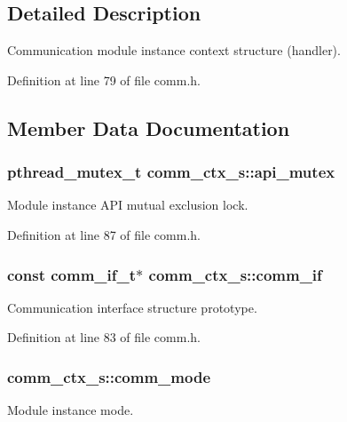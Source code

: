 \subsection{Detailed Description}
Communication module instance context structure (\textquotesingle{}handler\textquotesingle{}). 

Definition at line 79 of file comm.\+h.



\subsection{Member Data Documentation}
\subsubsection[{\texorpdfstring{api\+\_\+mutex}{api_mutex}}]{\setlength{\rightskip}{0pt plus 5cm}pthread\+\_\+mutex\+\_\+t comm\+\_\+ctx\+\_\+s\+::api\+\_\+mutex}\hypertarget{structcomm__ctx__s_a87f4bc5b93d50488325c43f384cb9d61}{}\label{structcomm__ctx__s_a87f4bc5b93d50488325c43f384cb9d61}
Module instance A\+PI mutual exclusion lock. 

Definition at line 87 of file comm.\+h.

\subsubsection[{\texorpdfstring{comm\+\_\+if}{comm_if}}]{\setlength{\rightskip}{0pt plus 5cm}const {\bf comm\+\_\+if\+\_\+t}$\ast$ comm\+\_\+ctx\+\_\+s\+::comm\+\_\+if}\hypertarget{structcomm__ctx__s_ada6c987982f09f27479ce375b5050534}{}\label{structcomm__ctx__s_ada6c987982f09f27479ce375b5050534}
Communication interface structure prototype. 

Definition at line 83 of file comm.\+h.

\subsubsection[{\texorpdfstring{comm\+\_\+mode}{comm_mode}}]{ comm\+\_\+ctx\+\_\+s\+::comm\+\_\+mode}\hypertarget{structcomm__ctx__s_a8e47d99809ed21c0d63e53529b3d0596}{}\label{structcomm__ctx__s_a8e47d99809ed21c0d63e53529b3d0596}
Module instance mode. 

